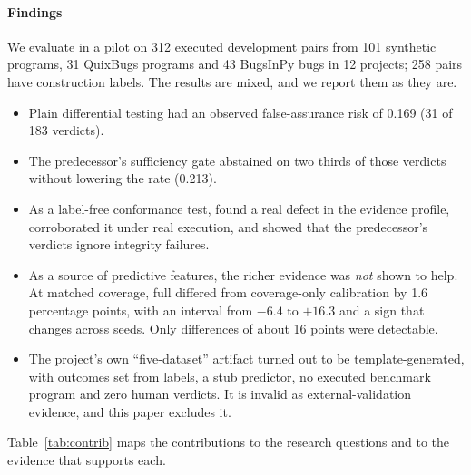 \paragraph*{Findings} We evaluate \sbg{} in a pilot on 312 executed development pairs from 101 synthetic programs, 31 QuixBugs programs and 43 BugsInPy bugs in 12 projects; 258 pairs have construction labels. The results are mixed, and we report them as they are.
\begin{itemize}
\item Plain differential testing had an observed false-assurance risk of 0.169 (31 of 183 \NDO{} verdicts).
\item The predecessor's sufficiency gate abstained on two thirds of those verdicts without lowering the rate (0.213).
\item As a label-free conformance test, \ers{} found a real defect in the evidence profile, corroborated it under real execution, and showed that the predecessor's verdicts ignore integrity failures.
\item As a source of predictive features, the richer evidence was \emph{not} shown to help. At matched coverage, full \cec{} differed from coverage-only calibration by 1.6 percentage points, with an interval from $-6.4$ to $+16.3$ and a sign that changes across seeds. Only differences of about 16 points were detectable.
\item The project's own ``five-dataset'' artifact turned out to be template-generated, with outcomes set from labels, a stub predictor, no executed benchmark program and zero human verdicts. It is invalid as external-validation evidence, and this paper excludes it.
\end{itemize}

Table~\ref{tab:contrib} maps the contributions to the research questions and to the evidence that supports each.

